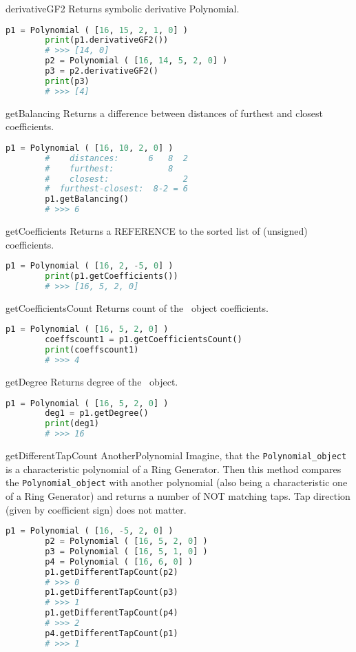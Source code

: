  {derivativeGF2} {} {
	Returns symbolic derivative Polynomial.
}
\begin{lstlisting}[language=Python]
		p1 = Polynomial ( [16, 15, 2, 1, 0] )
		print(p1.derivativeGF2())
		# >>> [14, 0]
		p2 = Polynomial ( [16, 14, 5, 2, 0] )
		p3 = p2.derivativeGF2()
		print(p3)
		# >>> [4]
\end{lstlisting}

 {getBalancing} {} {
	Returns a difference between distances of furthest and closest coefficients.
}
\begin{lstlisting}[language=Python]
		p1 = Polynomial ( [16, 10, 2, 0] )
		#    distances:      6   8  2
		#    furthest:           8
		#    closest:               2
		#  furthest-closest:  8-2 = 6
		p1.getBalancing()
		# >>> 6
\end{lstlisting}

 {getCoefficients} {} {
	Returns a REFERENCE to the sorted list of (unsigned) coefficients.
}
\begin{lstlisting}[language=Python]
		p1 = Polynomial ( [16, 2, -5, 0] )
		print(p1.getCoefficients())
		# >>> [16, 5, 2, 0]
\end{lstlisting}

 {getCoefficientsCount} {} {
	Returns count of the \Polynomial\ object coefficients.
}
\begin{lstlisting}[language=Python]
		p1 = Polynomial ( [16, 5, 2, 0] )
		coeffscount1 = p1.getCoefficientsCount()
		print(coeffscount1)
		# >>> 4
\end{lstlisting}

 {getDegree} {} {
	Returns degree of the \Polynomial\ object.
}
\begin{lstlisting}[language=Python]
		p1 = Polynomial ( [16, 5, 2, 0] )
		deg1 = p1.getDegree()
		print(deg1)
		# >>> 16
\end{lstlisting}

 {getDifferentTapCount} {AnotherPolynomial} {
	Imagine, that the \texttt{Polynomial\_object} is a characteristic polynomial of a Ring Generator. Then this method compares the \texttt{Polynomial\_object} with another polynomial (also being a characteristic one of a Ring Generator) and returns a number of NOT matching taps. Tap direction (given by coefficient sign) does not matter.
}
\begin{lstlisting}[language=Python]
		p1 = Polynomial ( [16, -5, 2, 0] )
		p2 = Polynomial ( [16, 5, 2, 0] )
		p3 = Polynomial ( [16, 5, 1, 0] )
		p4 = Polynomial ( [16, 6, 0] )
		p1.getDifferentTapCount(p2)
		# >>> 0
		p1.getDifferentTapCount(p3)
		# >>> 1
		p1.getDifferentTapCount(p4)
		# >>> 2
		p4.getDifferentTapCount(p1)
		# >>> 1
\end{lstlisting}

